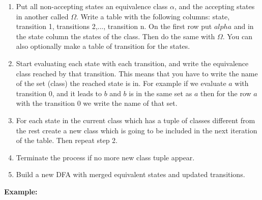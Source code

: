 \begin{enumerate}
    
    \item Put all non-accepting states an equivalence class \(\alpha\), and  the accepting states in another 
          called \(\Omega\). Write a table with the following columns: state, 
          transition 1, transitions 2,..., transition n. On the first row put \(alpha\) and in the state column 
          the states of the class. Then do the same with \(\Omega\). You can also optionally make a table 
          of transition for the states.

    \item Start evaluating each state with each transition, and write the equivalence class reached by that transition. 
          This means that you have to write the name of the set (class) the reached state is in. For example if 
          we evaluate \(a\) with transition 0, and it leads to \(b\) and \(b\) is in the same set as \(a\) then for 
          the row \(a\) with the transition 0 we write the name of that set.

    \item  For each state in the current class which has a tuple of classes different from the rest create 
           a new class which is going to be included in the next iteration of the table. Then repeat step 2.

    \item Terminate the process if no more new class tuple appear.

    \item Build a new DFA with merged equivalent states and updated transitions.

\end{enumerate}

\textbf{Example:}

\begin{center}
\end{center}

